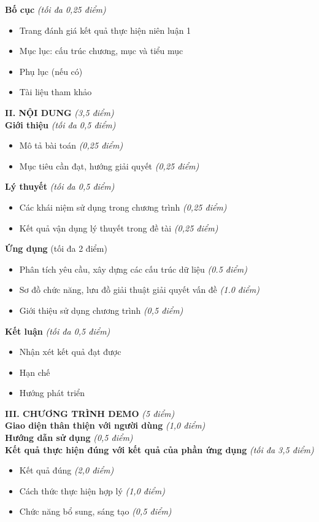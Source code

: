 \textbf{Bố cục} \textit{(tối đa 0,25 điểm)}
\begin{itemize}[itemsep=-6pt, topsep=-6pt]
  \item Trang đánh giá kết quả thực hiện niên luận 1
  \item Mục lục: cấu trúc chương, mục và tiểu mục
  \item Phụ lục (nếu có)
  \item Tài liệu tham khảo
\end{itemize}
\textbf{II. NỘI DUNG} \textit{(3,5 điểm)} \\
\textbf{Giới thiệu} \textit{(tối đa 0,5 điểm)}
\begin{itemize}[itemsep=-6pt, topsep=-6pt]
  \item Mô tả bài toán \textit{(0,25 điểm)}
  \item Mục tiêu cần đạt, hướng giải quyết \textit{(0,25 điểm)}
\end{itemize}
\textbf{Lý thuyết} \textit{(tối đa 0,5 điểm)}
\begin{itemize}[itemsep=-6pt, topsep=-6pt]
  \item Các khái niệm sử dụng trong chương trình \textit{(0,25 điểm)}
  \item Kết quả vận dụng lý thuyết trong đề tài \textit{(0,25 điểm)}
\end{itemize}
\textbf{Ứng dụng} (tối đa 2 điểm)
\begin{itemize}[itemsep=-6pt, topsep=-6pt]
  \item Phân tích yêu cầu, xây dựng các cấu trúc dữ liệu \textit{(0.5 điểm)}
  \item Sơ đồ chức năng, lưu đồ giải thuật giải quyết vấn đề \textit{(1.0 điểm)}
  \item Giới thiệu sử dụng chương trình \textit{(0,5 điểm)}
\end{itemize}
\textbf{Kết luận} \textit{(tối đa 0,5 điểm)}
\begin{itemize}[itemsep=-6pt, topsep=-6pt]
  \item Nhận xét kết quả đạt được
  \item Hạn chế
  \item Hướng phát triển
\end{itemize}
\textbf{III. CHƯƠNG TRÌNH DEMO} \textit{(5 điểm)}\\
\textbf{Giao diện thân thiện với người dùng} \textit{(1,0 điểm)}\\
\textbf{Hướng dẫn sử dụng} \textit{(0,5 điểm)}\\
\textbf{Kết quả thực hiện đúng với kết quả của phần ứng dụng} \textit{(tối đa 3,5 điểm)}
\begin{itemize}[itemsep=-6pt, topsep=-6pt]
  \item Kết quả đúng \textit{(2,0 điểm)}
  \item Cách thức thực hiện hợp lý \textit{(1,0 điểm)}
  \item Chức năng bổ sung, sáng tạo \textit{(0,5 điểm)}
\end{itemize}

